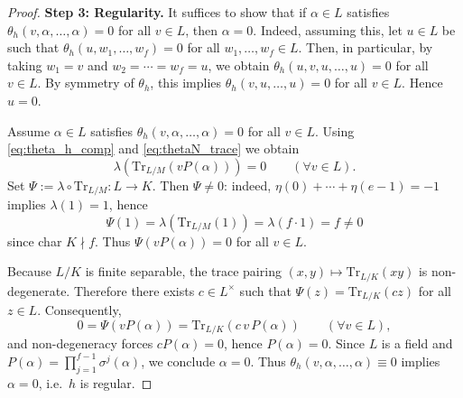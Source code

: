 \documentclass[10pt,a4paper]{amsart}
\newcommand{\Tr}{\mathrm{Tr}}
\begin{document}
\begin{proof}
\medskip\noindent
\textbf{Step 3: Regularity.}
It suffices to show that if $\alpha \in L$ satisfies $\theta_h(v,\alpha,\dots,\alpha)=0$ for all $v\in L$,
then $\alpha=0$.
Indeed, assuming this, let $u\in L$ be such that
$\theta_h(u,w_1,\dots,w_f)=0$ for all $w_1,\dots,w_f\in L$.
Then, in particular, by taking $w_1=v$ and $w_2=\cdots=w_f=u$, we obtain
$\theta_h(u,v,u,\dots,u)=0$ for all $v\in L$.
By symmetry of $\theta_h$, this implies
$\theta_h(v,u,\dots,u)=0$ for all $v\in L$.
Hence $u=0$.

Assume $\alpha\in L$ satisfies $\theta_h(v,\alpha,\dots,\alpha)=0$ for all $v\in L$.
Using \eqref{eq:theta_h_comp} and \eqref{eq:thetaN_trace} we obtain
\[
\lambda\!\left(\Tr_{L/M}(vP(\alpha))\right)=0\qquad(\forall v\in L).
\]
Set $\Psi:=\lambda\circ\Tr_{L/M}:L\to K$. 
Then $\Psi\neq 0$: indeed, $\eta(0)+\cdots+\eta(e-1)=-1$ implies $\lambda(1)=1$, hence
\[
\Psi(1)=\lambda\!\left(\Tr_{L/M}(1)\right)=\lambda(f\cdot 1)=f\neq 0
\]
since char $K\nmid f$.
Thus $\Psi(vP(\alpha))=0$ for all $v\in L$.

Because $L/K$ is finite separable, the trace pairing $(x,y)\mapsto\Tr_{L/K}(xy)$ is non-degenerate.
Therefore there exists $c\in L^\times$ such that $\Psi(z)=\Tr_{L/K}(cz)$ for all $z\in L$. 
Consequently,
\[
0=\Psi(vP(\alpha))=\Tr_{L/K}(c\,v\,P(\alpha))\qquad(\forall v\in L),
\]
and non-degeneracy forces $cP(\alpha)=0$, hence $P(\alpha)=0$. Since $L$ is a field and
$P(\alpha)=\prod_{j=1}^{f-1}\sigma^j(\alpha)$, we conclude $\alpha=0$.
Thus $\theta_h(v,\alpha,\dots,\alpha)\equiv 0$ implies $\alpha=0$, i.e.\ $h$ is regular.
\end{proof}
\end{document}
